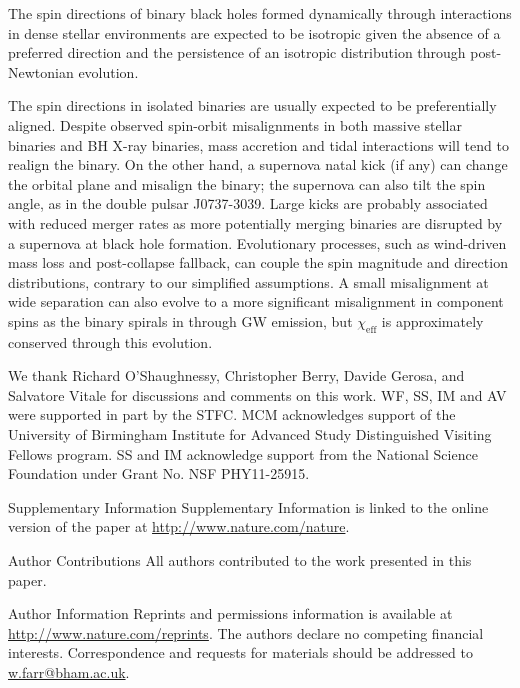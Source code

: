 \documentclass{nature}
\newcommand{\chieff}{\chi_\mathrm{eff}}
\begin{document}
The spin directions of binary black holes formed dynamically through
interactions in dense stellar
environments\cite{SigurdssonHernquist:1993,1993Natur.364..421K,PZMcMillan:2000,Rodriguez:2015,Stone:2016}
are expected to be isotropic given the absence of a preferred
direction\cite{2016ApJ...832L...2R} and the persistence of an
isotropic distribution through post-Newtonian
evolution\cite{2004PhRvD..70l4020S,2007ApJ...661L.147B}.

The spin directions in isolated
binaries\cite{TutukovYungelson:1973,TutukovYungelson:1993,Lipunov:1997,2016Natur.534..512B,Stevenson:2017,MandeldeMink:2016,Marchant:2016}
are usually expected to be preferentially aligned.  Despite observed
spin-orbit misalignments in both massive stellar
binaries\cite{Albrecht:2009,2014ApJ...785...83A} and BH X-ray
binaries\cite{Orosz:2001,Martin:2008b,Martin:2008,MorningstarMiller:2014},
mass accretion and tidal interactions will tend to realign the binary.
On the other hand, a supernova natal kick (if any) can change the
orbital plane and misalign the
binary\cite{2000ApJ...541..319K,2013PhRvD..87j4028G}; the supernova
can also tilt the spin angle, as in the double pulsar
J0737-3039\cite{2011ApJ...742...81F}.  Large kicks are probably
associated with reduced merger rates as more potentially merging binaries 
are disrupted by a supernova at black hole
formation\cite{1995MNRAS.277L..35B,2002ApJ...572..962S,2003CQGra..20S..73F,2004ApJ...616..414W,2016ApJ...832L...2R}. Evolutionary
processes, such as wind-driven mass loss and post-collapse fallback,
can couple the spin magnitude and direction distributions, contrary to
our simplified assumptions.  A small misalignment at wide separation
can also evolve to a more significant misalignment in component spins
as the binary spirals in through \ac{GW}
emission\cite{2015PhRvD..92f4016G}, but $\chieff$ is approximately
conserved through this evolution.

\begin{addendum}
\item We thank Richard O'Shaughnessy, Christopher Berry, Davide
  Gerosa, and Salvatore Vitale for discussions and comments on this
  work.  WF, SS, IM and AV were supported in part by the STFC.  MCM
  acknowledges support of the University of Birmingham Institute for
  Advanced Study Distinguished Visiting Fellows program.  SS and IM
  acknowledge support from the National Science Foundation under Grant
  No. NSF PHY11-25915.
\item[Supplementary Information] Supplementary Information is linked
  to the online version of the paper at
  \url{http://www.nature.com/nature}.
\item[Author Contributions] All authors contributed to the work
  presented in this paper.
\item[Author Information] Reprints and permissions information is
  available at \url{http://www.nature.com/reprints}.  The authors
  declare no competing financial interests.  Correspondence and
  requests for materials should be addressed to
  \href{mailto:w.farr@bham.ac.uk}{w.farr@bham.ac.uk}.
\end{addendum}
\end{document}
